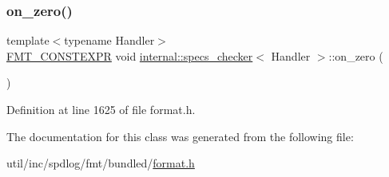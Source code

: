 \subsubsection{\texorpdfstring{on\+\_\+zero()}{on\_zero()}}
{\footnotesize\ttfamily template$<$typename Handler$>$ \\
\hyperlink{core_8h_a69201cb276383873487bf68b4ef8b4cd}{F\+M\+T\+\_\+\+C\+O\+N\+S\+T\+E\+X\+PR} void \hyperlink{classinternal_1_1specs__checker}{internal\+::specs\+\_\+checker}$<$ Handler $>$\+::on\+\_\+zero (\begin{DoxyParamCaption}{ }\end{DoxyParamCaption})\hspace{0.3cm}{\ttfamily [inline]}}



Definition at line 1625 of file format.\+h.



The documentation for this class was generated from the following file\+:\begin{DoxyCompactItemize}
\item 
util/inc/spdlog/fmt/bundled/\hyperlink{format_8h}{format.\+h}\end{DoxyCompactItemize}
